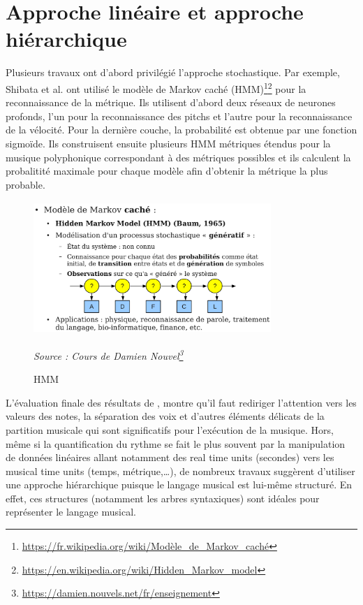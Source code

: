 \section{Approche linéaire et approche hiérarchique}
Plusieurs travaux ont d’abord privilégié l’approche stochastique. Par exemple, Shibata et al.\cite{SHIBATA2021262} ont utilisé le modèle de Markov caché (HMM)\footnote{\url{https://fr.wikipedia.org/wiki/Modèle_de_Markov_caché}}\footnote{\url{https://en.wikipedia.org/wiki/Hidden_Markov_model}} pour la reconnaissance de la métrique. Ils utilisent d’abord deux réseaux de neurones profonds, l’un pour la reconnaissance des pitchs et l’autre pour la reconnaissance de la vélocité. Pour la dernière couche, la probabilité est obtenue par une fonction sigmoïde. Ils construisent ensuite plusieurs HMM métriques étendus pour la musique polyphonique correspondant à des métriques possibles et ils calculent la probalitité maximale pour chaque modèle afin d’obtenir la métrique la plus probable.
\begin{figure}[h]
	\centering
	\includegraphics[height=50mm, width=90mm]{z_images/2_etat_de_l_art/hmm.png}
	\caption{HMM}
	\textit{Source : Cours de Damien Nouvel\footnote{\url{https://damien.nouvels.net/fr/enseignement}}}
\end{figure}
L’évaluation finale des résultats de \cite{SHIBATA2021262}, montre qu’il faut rediriger l’attention vers les valeurs des notes, la séparation des voix et d'autres éléments délicats de la partition musicale qui sont significatifs pour l'exécution de la musique. Hors, même si la quantification du rythme se fait le plus souvent par la manipulation de données linéaires allant notamment des real time units (secondes) vers les musical time units (temps, métrique,…), de nombreux travaux suggèrent d’utiliser une approche hiérarchique puisque le langage musical est lui-même structuré. En effet, ces structures (notamment les arbres syntaxiques) sont idéales pour représenter le langage musical.
